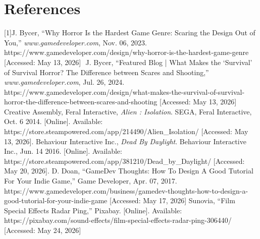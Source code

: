 \documentclass{article}
\begin{document}
\section{References}
[1]J. Bycer, “Why Horror Is the Hardest Game Genre: Scaring the Design Out of You,” \textit{www.gamedeveloper.com}, Nov. 06, 2023. https://www.gamedeveloper.com/design/why-horror-is-the-hardest-game-genre [Accessed: May 13, 2026]
‌\newline
‌\newline
[2]J. Bycer, “Featured Blog | What Makes the ‘Survival’ of Survival Horror? The Difference between Scares and Shooting,” \textit{www.gamedeveloper.com}, Jul. 26, 2024. https://www.gamedeveloper.com/design/what-makes-the-survival-of-survival-horror-the-difference-between-scares-and-shooting [Accessed: May 13, 2026]
\newline
‌\newline
[3]Creative Assembly, Feral Interactive, \textit{Alien : Isolation}. SEGA, Feral Interactive, Oct. 6 2014. [Online].  Available: https://store.steampowered.com/app/214490/Alien\_Isolation/ [Accessed: May 13, 2026].
\newline
‌\newline
[4]Behaviour Interactive Inc., \textit{Dead By Daylight}. Behaviour Interactive Inc., Jun. 14 2016. [Online].  Available: https://store.steampowered.com/app/381210/Dead\_by\_Daylight/ [Accessed: May 20, 2026].
\newline
‌\newline
[5]D. Doan, “GameDev Thoughts: How To Design A Good Tutorial For Your Indie Game,” Game Developer, Apr. 07, 2017. https://www.gamedeveloper.com/business/gamedev-thoughts-how-to-design-a-good-tutorial-for-your-indie-game [Accessed: May 17, 2026]
\newline
\newline
[6] Sunovia, “Film Special Effects Radar Ping,” Pixabay. [Online]. Available: https://pixabay.com/sound-effects/film-special-effects-radar-ping-306440/ [Accessed: May 24, 2026]

\glsaddall
\printglossary
\end{document}
